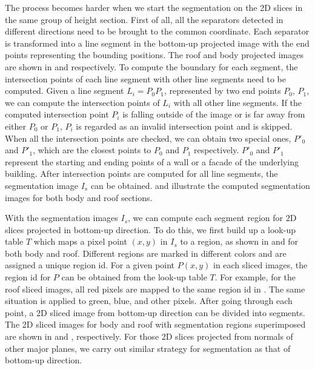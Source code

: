 The process becomes harder when we start the segmentation
on the 2D slices in the same group of height section.
First of all, all the separators detected in different directions
need to be brought to the common coordinate.
Each separator is transformed into
a line segment in the bottom-up projected image with the end points
representing the bounding positions.
The roof and body projected images are shown in
 and  respectively.
To compute the boundary for each segment,
the intersection points of
each line segment with other line segments need to be computed.
%
Given a line segment $L_i = P_0P_1$, represented by two end points $P_0$, $P_1$,
we can compute the intersection points of
$L_i$ with all other line segments.
If the computed intersection point $P_i$ is falling outside of the image or
is far away from either $P_0$ or $P_1$,
$P_i$ is regarded as an invalid intersection point and is skipped.
When all the intersection points are checked,
we can obtain two special ones, $P'_0$ and $P'_1$,
which are the closest points to $P_0$ and $P_1$ respectively.
$P'_0$ and $P'_1$ represent the starting and ending points
of a wall or a facade of the underlying building.
After intersection points are computed for all line segments,
the segmentation image $I_s$ can be obtained.
 and  illustrate the computed segmentation images
for both body and roof sections.

With the segmentation images $I_s$,
we can compute each segment region for 2D slices projected in bottom-up direction.
To do this, we first build up a look-up table $T$
which maps a pixel point $(x, y)$ in $I_s$ to a region,
as shown in  and  for both body and roof.
Different regions are marked in different colors
and are assigned a unique region id.
For a given point $P(x, y)$ in each sliced images,
the region id for $P$ can be obtained from the look-up table $T$.
For example, for the roof sliced images,
all red pixels are mapped to the same region id in .
The same situation is applied to green, blue, and other pixels.
After going through each point, a 2D sliced image from bottom-up direction
can be divided into segments.
The 2D sliced images for body and roof
with segmentation regions superimposed
are shown in  and , respectively.
For those 2D slices projected from normals of other major planes,
we carry out similar strategy for segmentation as that of bottom-up direction.



